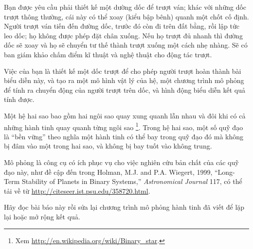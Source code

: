 \documentclass[12pt]{book}
\begin{document}
\begin{ex}
Bạn được yêu cầu phải thiết kế một dường dốc để trượt ván; khác với
những dốc trượt thông thường, cái này có thể xoay (kiểu bập bênh) quanh
một chốt cố định. Người trượt ván tiến đến đường dốc, trước đó còn đi
trên đất bằng, rồi lập tức leo dốc; họ không được phép đặt chân xuống.
Nếu họ trượt đủ nhanh thì đường dốc sẽ xoay và họ sẽ chuyển tư thế
thành trượt xuống một cách nhẹ nhàng. Sẽ có ban giám khảo chấm điểm
kĩ thuật và nghệ thuật cho động tác trượt.

Việc của bạn là thiết kế một dốc trượt để cho phép người trượt hoàn thành
bài biểu diễn này, và tạo ra một mô hình vật lý của hệ, một chương trình
mô phỏng để tính ra chuyển động của người trượt trên dốc, và hình động
biểu diễn kết quả tính được.
\end{ex}

\begin{ex}
\label{binary}

Một hệ hai sao bao gồm hai ngôi sao quay xung quanh lẫn nhau và
đôi khi có cả những hành tinh quay quanh từng ngôi sao
\footnote{Xem \url{http://en.wikipedia.org/wiki/Binary_star}.}. Trong
hệ hai sao, một số quỹ đạo là ``bền vững'' theo nghĩa một hành tinh
có thể bay trong quỹ đạo đó mà không bị đâm vào một trong hai sao,
và không bị bay tuốt vào không trung.

Mô phỏng là công cụ có ích phục vụ cho việc nghiên cứu bản chất
của các quỹ đạo này, như đề cập đến trong Holman, M.J. and P.A. 
Wiegert, 1999, ``Long-Term Stability
of Planets in Binary Systems,''  {\em Astronomical Journal} 117, 
có thể tải về từ \url{http://citeseer.ist.psu.edu/358720.html}.

Hãy đọc bài báo này rồi sửa lại chương trình mô phỏng hành tinh
đã viết để lặp lại hoặc mở rộng kết quả.
\end{ex}

\newpage

\end{document}
